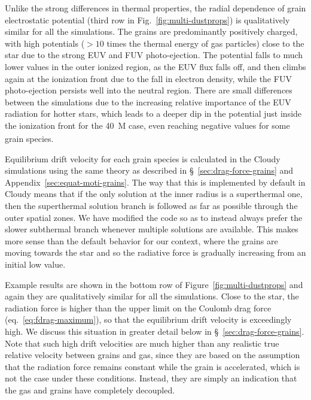 Unlike the strong differences in thermal properties, the radial
dependence of grain electrostatic potential (third row in
Fig.~\ref{fig:multi-dustprops}) is qualitatively similar for all the
simulations.  The grains are predominantly positively charged, with high
potentials (\(> 10\) times the thermal energy of gas particles) close
to the star due to the strong EUV and FUV photo-ejection.  The
potential falls to much lower values in the outer ionized region, as
the EUV flux falls off, and then climbs again at the ionization front
due to the fall in electron density, while the FUV photo-ejection
persists well into the neutral region.  There are small differences
between the simulations due to the increasing relative importance of the
EUV radiation for hotter stars, which leads to a deeper dip in the
potential just inside the ionization front for the \SI{40}{M_\odot} case,
even reaching negative values for some grain species.

Equilibrium drift velocity for each grain species is calculated in the
Cloudy simulations using the same \citet{Draine:1979a} theory as
described in \S~\ref{sec:drag-force-grains} and
Appendix~\ref{sec:equat-moti-grains}.  The way that this is
implemented by default in Cloudy means that if the only solution at
the inner radius is a superthermal one, then the superthermal solution
branch is followed as far as possible through the outer spatial zones.
We have modified the code so as to instead always prefer the slower
subthermal branch whenever multiple solutions are available.  This
makes more sense than the default behavior for our context, where the
grains are moving towards the star and so the radiative force is
gradually increasing from an initial low value.

Example results are shown in the bottom row of
Figure~\ref{fig:multi-dustprops} and again they are qualitatively
similar for all the simulations.  Close to the star, the radiation
force is higher than the upper limit on the Coulomb drag force
(eq.~\eqref{eq:fdrag-maximum}), so that the equilibrium drift velocity
is exceedingly high.  We discuss this situation in greater detail
below in \S~\ref{sec:drag-force-grains}.  Note that such high drift
velocities are much higher than any realistic true relative velocity
between grains and gas, since they are based on the assumption that
the radiation force remains constant while the grain is accelerated,
which is not the case under these conditions.  Instead, they are
simply an indication that the gas and grains have completely
decoupled.

